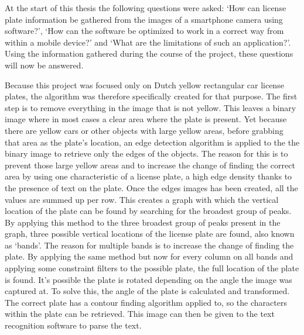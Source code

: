 
At the start of this thesis the following questions were asked: `How can license plate information be gathered from the images of a smartphone camera using software?', `How can the software be optimized to work in a correct way from within a mobile device?' and `What are the limitations of such an application?'. Using the information gathered during the course of the project, these questions will now be answered.


Because this project was focused only on Dutch yellow rectangular car license plates, the algorithm was therefore specifically created for that purpose. The first step is to remove everything in the image that is not yellow. This leaves a binary image where in most cases a clear area where the plate is present. Yet because there are yellow cars or other objects with large yellow areas, before grabbing that area as the plate's location, an edge detection algorithm is applied to the the binary image to retrieve only the edges of the objects. The reason for this is to prevent those large yellow areas and to increase the change of finding the correct area by using one characteristic of a license plate, a high edge density thanks to the presence of text on the plate. Once the edges images has been created, all the values are summed up per row. This creates a graph with which the vertical location of the plate can be found by searching for the broadest group of peaks. By applying this method to the three broadest group of peaks present in the graph, three possible vertical locations of the license plate are found, also known as `bands'. The reason for multiple bands is to increase the change of finding the plate. By applying the same method but now for every column on all bands and applying some constraint filters to the possible plate, the full location of the plate is found. It's possible the plate is rotated depending on the angle the image was captured at. To solve this, the angle of the plate is calculated and transformed. The correct plate has a contour finding algorithm applied to, so the characters within the plate can be retrieved. This image can then be given to the text recognition software to parse the text.



